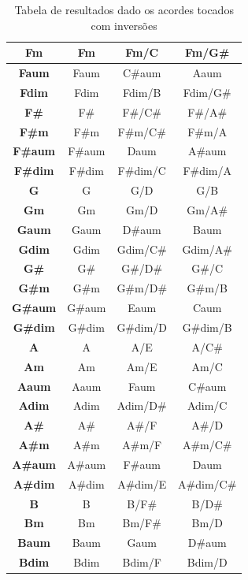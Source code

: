 \begin{table}[ht!]
{\begin{tabular}{ | c | c | c | c |}
    \hline
    \textbf{Fm} & Fm & Fm/C & Fm/G\# \\
    \hline
    \textbf{Faum} & Faum & C\#aum & Aaum \\
    \hline
    \textbf{Fdim} & Fdim & Fdim/B & Fdim/G\# \\
    \hline
    \textbf{F\#} & F\# & F\#/C\# & F\#/A\# \\
    \hline
    \textbf{F\#m} & F\#m & F\#m/C\# & F\#m/A \\
    \hline
    \textbf{F\#aum} & F\#aum & Daum & A\#aum \\
    \hline
    \textbf{F\#dim} & F\#dim & F\#dim/C & F\#dim/A \\
    \hline
    \textbf{G} & G & G/D & G/B \\
    \hline
    \textbf{Gm} & Gm & Gm/D & Gm/A\# \\
    \hline
    \textbf{Gaum} & Gaum & D\#aum & Baum \\
    \hline
    \textbf{Gdim} & Gdim & Gdim/C\# & Gdim/A\# \\
    \hline
    \textbf{G\#} & G\# & G\#/D\# & G\#/C \\
    \hline
    \textbf{G\#m} & G\#m & G\#m/D\# & G\#m/B \\
    \hline
    \textbf{G\#aum} & G\#aum & Eaum & Caum \\
    \hline
    \textbf{G\#dim} & G\#dim & G\#dim/D & G\#dim/B \\
    \hline
    \textbf{A} & A & A/E & A/C\# \\
    \hline
    \textbf{Am} & Am & Am/E & Am/C \\
    \hline
    \textbf{Aaum} & Aaum & Faum & C\#aum \\
    \hline
    \textbf{Adim} & Adim & Adim/D\# & Adim/C \\
    \hline
    \textbf{A\#} & A\# & A\#/F & A\#/D \\
    \hline
    \textbf{A\#m} & A\#m & A\#m/F & A\#m/C\# \\
    \hline
    \textbf{A\#aum} & A\#aum & F\#aum & Daum \\
    \hline
    \textbf{A\#dim} & A\#dim & A\#dim/E & A\#dim/C\# \\
    \hline
    \textbf{B} & B & B/F\# & B/D\# \\
    \hline
    \textbf{Bm} & Bm & Bm/F\# & Bm/D \\
    \hline
    \textbf{Baum} & Baum & Gaum & D\#aum \\
    \hline
    \textbf{Bdim} & Bdim & Bdim/F & Bdim/D \\
    \hline
  \end{tabular}
  }
  \caption{Tabela de resultados dado os acordes tocados com inversões}
  \label{tab:label_test}
\end{table}

